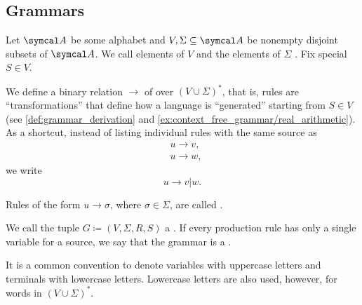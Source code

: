 \subsection{Grammars}\label{subsec:grammars}

\begin{definition}\label{def:grammar}\cite[definition 2.2]{Sipser2013}
  Let \( \Cal{A} \) be some alphabet and \( V, \Sigma \subseteq \Cal{A} \) be nonempty disjoint subsets of \( \Cal{A} \). We call elements of \( V \)  and the elements of \( \Sigma \) . Fix special  \( S \in V \).

  We define a binary relation \( \to \) of  over \( (V \cup \Sigma)^* \), that is, rules are \enquote{transformations} that define how a language is \enquote{generated} starting from \( S \in V \) (see \cref{def:grammar_derivation} and \cref{ex:context_free_grammar/real_arithmetic}). As a shortcut, instead of listing individual rules with the same source as
  \begin{align*}
    &u \to v, \\
    &u \to w,
  \end{align*}
  we write
  \begin{equation*}
    u \to v | w.
  \end{equation*}

  Rules of the form \( u \to \sigma \), where \( \sigma \in \Sigma \), are called .

  We call the tuple \( G \coloneqq (V, \Sigma, R, S) \) a . If every production rule has only a single variable for a source, we say that the grammar is a .
\end{definition}

\begin{remark}\label{remark:grammar_symbol_case}
  It is a common convention to denote variables with uppercase letters and terminals with lowercase letters. Lowercase letters are also used, however, for words in \( (V \cup \Sigma)^* \).
\end{remark}


